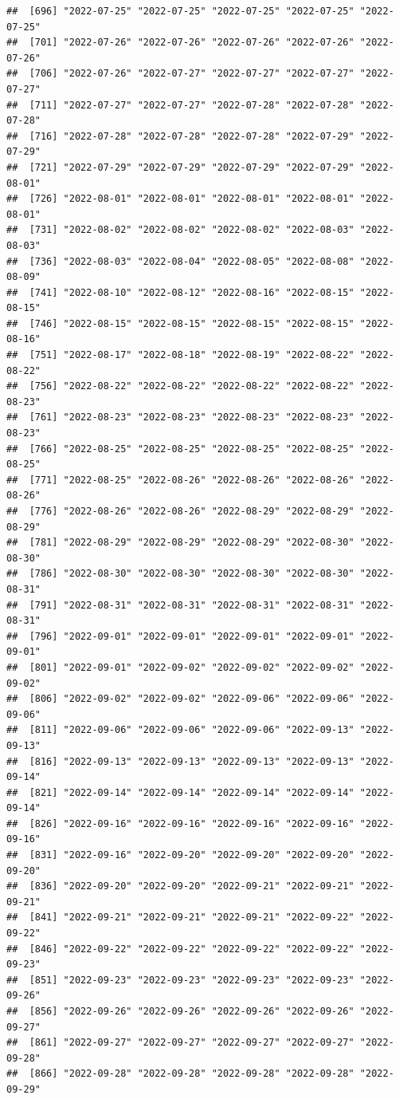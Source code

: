 \documentclass[
]{article}
\begin{document}
\begin{verbatim}
##  [696] "2022-07-25" "2022-07-25" "2022-07-25" "2022-07-25" "2022-07-25"
##  [701] "2022-07-26" "2022-07-26" "2022-07-26" "2022-07-26" "2022-07-26"
##  [706] "2022-07-26" "2022-07-27" "2022-07-27" "2022-07-27" "2022-07-27"
##  [711] "2022-07-27" "2022-07-27" "2022-07-28" "2022-07-28" "2022-07-28"
##  [716] "2022-07-28" "2022-07-28" "2022-07-28" "2022-07-29" "2022-07-29"
##  [721] "2022-07-29" "2022-07-29" "2022-07-29" "2022-07-29" "2022-08-01"
##  [726] "2022-08-01" "2022-08-01" "2022-08-01" "2022-08-01" "2022-08-01"
##  [731] "2022-08-02" "2022-08-02" "2022-08-02" "2022-08-03" "2022-08-03"
##  [736] "2022-08-03" "2022-08-04" "2022-08-05" "2022-08-08" "2022-08-09"
##  [741] "2022-08-10" "2022-08-12" "2022-08-16" "2022-08-15" "2022-08-15"
##  [746] "2022-08-15" "2022-08-15" "2022-08-15" "2022-08-15" "2022-08-16"
##  [751] "2022-08-17" "2022-08-18" "2022-08-19" "2022-08-22" "2022-08-22"
##  [756] "2022-08-22" "2022-08-22" "2022-08-22" "2022-08-22" "2022-08-23"
##  [761] "2022-08-23" "2022-08-23" "2022-08-23" "2022-08-23" "2022-08-23"
##  [766] "2022-08-25" "2022-08-25" "2022-08-25" "2022-08-25" "2022-08-25"
##  [771] "2022-08-25" "2022-08-26" "2022-08-26" "2022-08-26" "2022-08-26"
##  [776] "2022-08-26" "2022-08-26" "2022-08-29" "2022-08-29" "2022-08-29"
##  [781] "2022-08-29" "2022-08-29" "2022-08-29" "2022-08-30" "2022-08-30"
##  [786] "2022-08-30" "2022-08-30" "2022-08-30" "2022-08-30" "2022-08-31"
##  [791] "2022-08-31" "2022-08-31" "2022-08-31" "2022-08-31" "2022-08-31"
##  [796] "2022-09-01" "2022-09-01" "2022-09-01" "2022-09-01" "2022-09-01"
##  [801] "2022-09-01" "2022-09-02" "2022-09-02" "2022-09-02" "2022-09-02"
##  [806] "2022-09-02" "2022-09-02" "2022-09-06" "2022-09-06" "2022-09-06"
##  [811] "2022-09-06" "2022-09-06" "2022-09-06" "2022-09-13" "2022-09-13"
##  [816] "2022-09-13" "2022-09-13" "2022-09-13" "2022-09-13" "2022-09-14"
##  [821] "2022-09-14" "2022-09-14" "2022-09-14" "2022-09-14" "2022-09-14"
##  [826] "2022-09-16" "2022-09-16" "2022-09-16" "2022-09-16" "2022-09-16"
##  [831] "2022-09-16" "2022-09-20" "2022-09-20" "2022-09-20" "2022-09-20"
##  [836] "2022-09-20" "2022-09-20" "2022-09-21" "2022-09-21" "2022-09-21"
##  [841] "2022-09-21" "2022-09-21" "2022-09-21" "2022-09-22" "2022-09-22"
##  [846] "2022-09-22" "2022-09-22" "2022-09-22" "2022-09-22" "2022-09-23"
##  [851] "2022-09-23" "2022-09-23" "2022-09-23" "2022-09-23" "2022-09-26"
##  [856] "2022-09-26" "2022-09-26" "2022-09-26" "2022-09-26" "2022-09-27"
##  [861] "2022-09-27" "2022-09-27" "2022-09-27" "2022-09-27" "2022-09-28"
##  [866] "2022-09-28" "2022-09-28" "2022-09-28" "2022-09-28" "2022-09-29"

\end{verbatim}
\end{document}
